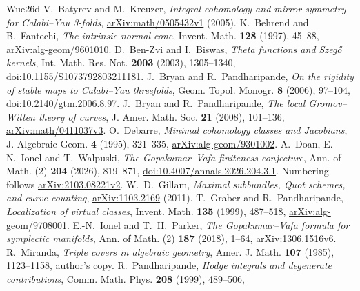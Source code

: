 \begin{thebibliography}{Wue26d}
 V.~Batyrev and M.~Kreuzer,
\emph{Integral cohomology and mirror symmetry for Calabi--Yau 3-folds},
\href{https://arxiv.org/abs/math/0505432v1}{arXiv:math/0505432v1} (2005).
 K.~Behrend and B.~Fantechi,
\emph{The intrinsic normal cone}, Invent. Math. \textbf{128} (1997), 45--88,
\href{https://arxiv.org/abs/alg-geom/9601010}{arXiv:alg-geom/9601010}.
 D.~Ben-Zvi and I.~Biswas, \emph{Theta functions and
Szeg\H{o} kernels}, Int. Math. Res. Not. \textbf{2003} (2003), 1305--1340,
\href{https://doi.org/10.1155/S1073792803211181}{doi:10.1155/S1073792803211181}.
 J.~Bryan and R.~Pandharipande,
\emph{On the rigidity of stable maps to Calabi--Yau threefolds},
Geom. Topol. Monogr. \textbf{8} (2006), 97--104,
\href{https://doi.org/10.2140/gtm.2006.8.97}{doi:10.2140/gtm.2006.8.97}.
 J.~Bryan and R.~Pandharipande,
\emph{The local Gromov--Witten theory of curves},
J. Amer. Math. Soc. \textbf{21} (2008), 101--136,
\href{https://arxiv.org/abs/math/0411037v3}{arXiv:math/0411037v3}.
 O.~Debarre, \emph{Minimal cohomology classes and Jacobians},
J. Algebraic Geom. \textbf{4} (1995), 321--335,
\href{https://arxiv.org/abs/alg-geom/9301002}{arXiv:alg-geom/9301002}.
 A.~Doan, E.-N.~Ionel and T.~Walpuski,
\emph{The Gopakumar--Vafa finiteness conjecture},
Ann. of Math. (2) \textbf{204} (2026), 819--871,
\href{https://doi.org/10.4007/annals.2026.204.3.1}{doi:10.4007/annals.2026.204.3.1}.
Numbering follows \href{https://arxiv.org/abs/2103.08221v2}{arXiv:2103.08221v2}.
 W.~D.~Gillam,
\emph{Maximal subbundles, Quot schemes, and curve counting},
\href{https://arxiv.org/abs/1103.2169}{arXiv:1103.2169} (2011).
 T.~Graber and R.~Pandharipande,
\emph{Localization of virtual classes}, Invent. Math. \textbf{135} (1999), 487--518,
\href{https://arxiv.org/abs/alg-geom/9708001}{arXiv:alg-geom/9708001}.
 E.-N.~Ionel and T.~H.~Parker,
\emph{The Gopakumar--Vafa formula for symplectic manifolds},
Ann. of Math. (2) \textbf{187} (2018), 1--64,
\href{https://arxiv.org/abs/1306.1516v6}{arXiv:1306.1516v6}.
 R.~Miranda, \emph{Triple covers in algebraic geometry},
Amer. J. Math. \textbf{107} (1985), 1123--1158,
\href{https://www.math.colostate.edu/~miranda/preprints/TripleCoversInAG.pdf}{author's copy}.
 R.~Pandharipande, \emph{Hodge integrals and
degenerate contributions}, Comm. Math. Phys. \textbf{208} (1999), 489--506,

\end{thebibliography}
